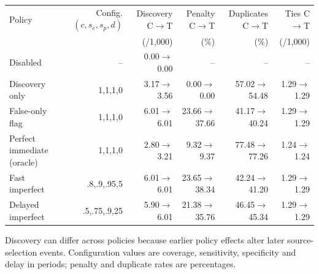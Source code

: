 \scriptsize
\begin{tabular}{lrrrrr}
\toprule
Policy & Config. $(c,s_e,s_p,d)$ & Discovery C$\to$T & Penalty C$\to$T & Duplicates C$\to$T & Ties C$\to$T \\
& & (/1,000) & (\%) & (\%) & (/1,000) \\
\midrule
Disabled & -- & 0.00$\to$0.00 & -- & -- & -- \\
Discovery only & 1,1,1,0 & 3.17$\to$3.56 & 0.00$\to$0.00 & 57.02$\to$54.48 & 1.29$\to$1.29 \\
False-only flag & 1,1,1,0 & 6.01$\to$6.01 & 23.66$\to$37.66 & 41.17$\to$40.24 & 1.29$\to$1.29 \\
Perfect immediate (oracle) & 1,1,1,0 & 2.80$\to$3.21 & 9.32$\to$9.37 & 77.48$\to$77.26 & 1.24$\to$1.24 \\
Fast imperfect & .8,.9,.95,5 & 6.01$\to$6.01 & 23.65$\to$38.34 & 42.24$\to$41.20 & 1.29$\to$1.29 \\
Delayed imperfect & .5,.75,.9,25 & 5.90$\to$6.01 & 21.38$\to$35.76 & 46.45$\to$45.34 & 1.29$\to$1.29 \\
\bottomrule
\end{tabular}
\par\vspace{1mm}\footnotesize Discovery can differ across policies because earlier policy effects alter later source-selection events. Configuration values are coverage, sensitivity, specificity and delay in periods; penalty and duplicate rates are percentages.
\normalsize
